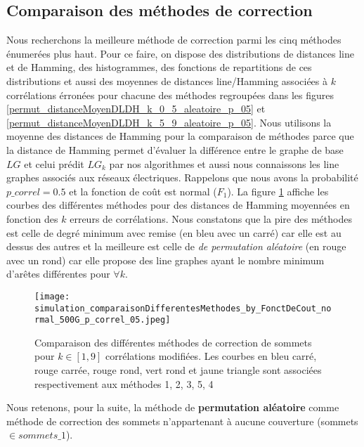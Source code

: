 \documentclass[onecolumn, 12pt]{book}
\begin{document}
\subsection{Comparaison des m\'ethodes de correction}
Nous recherchons la meilleure m\'ethode de correction parmi les cinq m\'ethodes \'enumer\'ees plus haut. 
Pour ce faire, on dispose des distributions de distances line et de Hamming, des histogrammes, des fonctions de repartitions de ces distributions et aussi des moyennes de distances line/Hamming associ\'ees \`a $k$ corr\'elations \'erron\'ees pour chacune des m\'ethodes regroup\'ees dans les figures \ref{permut_distanceMoyenDLDH_k_0_5_aleatoire_p_05} et \ref{permut_distanceMoyenDLDH_k_5_9_aleatoire_p_05}.  
Nous utilisons la moyenne des distances de Hamming pour la comparaison de m\'ethodes parce que la distance de Hamming permet d'\'evaluer la diff\'erence entre le graphe de base $LG$ et celui pr\'edit $LG_k$ par nos algorithmes et aussi nous connaissons les line graphes associ\'es aux r\'eseaux \'electriques.\newline
Rappelons que nous avons la probabilit\'e $p\_correl=0.5$ et la fonction de co\^ut est normal ($F_1$).
La figure \ref{compareDifferentesMethodesCorrectionSommets_fct_cout_normal_p05} affiche les courbes  des diff\'erentes m\'ethodes pour des distances de Hamming moyenn\'ees en fonction des $k$ erreurs de corr\'elations.
\newline
Nous constatons  que la pire des m\'ethodes est celle de degr\'e minimum avec remise (en bleu avec un carr\'e) car elle est au dessus des autres et la meilleure est celle de {\em de permutation al\'eatoire} (en rouge avec un rond) car elle propose des line graphes ayant  le nombre minimum d'ar\^etes diff\'erentes pour $ \forall k$.\newline
\begin{figure}[htb!] 
\centering
\texttt{[image: simulation\_comparaisonDifferentesMethodes\_by\_FonctDeCout\_normal\_500G\_p\_correl\_05.jpeg]}
\caption{ Comparaison des diff\'erentes m\'ethodes de correction de sommets pour $k \in [1,9]$ corr\'elations modifi\'ees. Les courbes en bleu carr\'e, rouge carr\'ee, rouge rond, vert rond et jaune triangle sont associ\'ees respectivement aux m\'ethodes 1, 2, 3, 5, 4 }
\label{compareDifferentesMethodesCorrectionSommets_fct_cout_normal_p05} 
\end{figure}
Nous retenons, pour la suite, la m\'ethode de {\bf permutation al\'eatoire} comme m\'ethode de correction des sommets n'appartenant \`a aucune couverture (sommets $\in sommets\_1$).
\newline
\end{document}
